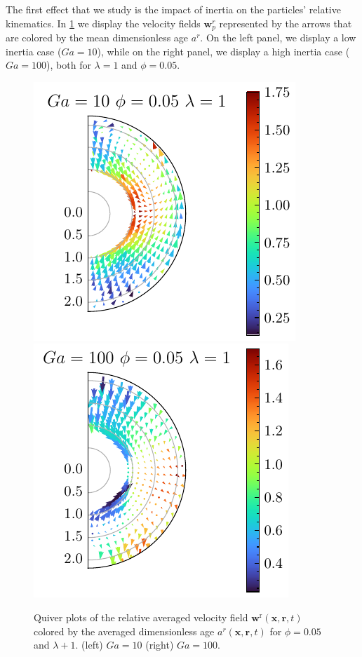The first effect that we study is the impact of inertia on the particles' relative kinematics.    
In \ref{fig:Why_Ga_matter} we display the velocity fields $\textbf{w}_p^r$ represented by the arrows that are colored by the mean dimensionless age $a^r$.  
On the left panel, we display a low inertia case ($Ga = 10$), while on the right panel, we display a high inertia case ($Ga=100$), both for $\lambda =1$ and $\phi=0.05$.
\begin{figure}[h!]
    \centering
    \includegraphics[height=0.35\textwidth]{image/HOMOGENEOUS_NEW/Dist/U_rel_l_1_Ga_10_PHI_5.pdf}
    \includegraphics[height=0.35\textwidth]{image/HOMOGENEOUS_NEW/Dist/U_rel_l_1_Ga_100_PHI_5.pdf}
    \caption{
         Quiver plots of the relative averaged velocity field $\textbf{w}^\text{r}(\textbf{x},\textbf{r},t)$ colored by the averaged dimensionless age $a^r(\textbf{x},\textbf{r},t)$ for $\phi = 0.05$ and $\lambda +1$.
         (left) $Ga = 10$ (right) $Ga =100$. }
    \label{fig:Why_Ga_matter}
\end{figure}

